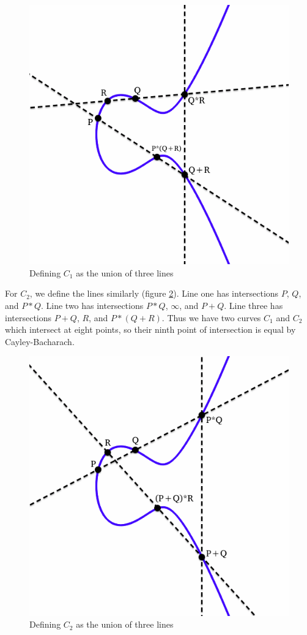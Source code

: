 \documentclass{article}
\begin{document}
\begin{figure}[h]
\centering
\includegraphics[width=0.7\linewidth]{images/ec5-assoc-1.png}
\caption{Defining $C_1$ as the union of three lines}
\label{fig:ec-assoc-1}
\end{figure}

For $C_2$, we define the lines similarly (figure \ref{fig:ec-assoc-2}).
Line one has intersections $P$, $Q$, and $P*Q$.
Line two has intersections $P*Q$, $\infty$, and $P+Q$.
Line three has intersections $P+Q$, $R$, and $P*(Q+R)$.
Thus we have two curves $C_1$ and $C_2$ which intersect at eight points, so their ninth point of intersection is equal by Cayley-Bacharach.
\cite[\S 1.2]{rational-points}

\begin{figure}[h]
\centering
\includegraphics[width=0.7\linewidth]{images/ec5-assoc-2.png}
\caption{Defining $C_2$ as the union of three lines}
\label{fig:ec-assoc-2}
\end{figure}
\end{document}
